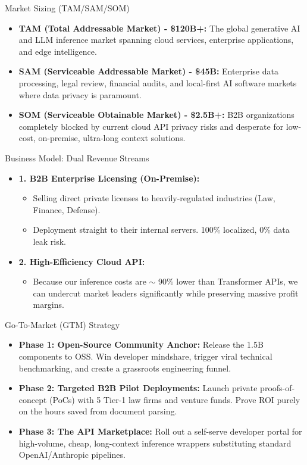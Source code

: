 ﻿\documentclass[aspectratio=169, 10pt]{beamer}
\begin{document}
\begin{frame}{Market Sizing (TAM/SAM/SOM)}
\begin{itemize}
    \item \textbf{TAM (Total Addressable Market) - \$120B+:} The global generative AI and LLM inference market spanning cloud services, enterprise applications, and edge intelligence.
    \item \textbf{SAM (Serviceable Addressable Market) - \$45B:} Enterprise data processing, legal review, financial audits, and local-first AI software markets where data privacy is paramount.
    \item \textbf{SOM (Serviceable Obtainable Market) - \$2.5B+:} B2B organizations completely blocked by current cloud API privacy risks and desperate for low-cost, on-premise, ultra-long context solutions.
\end{itemize}
\end{frame}

\begin{frame}{Business Model: Dual Revenue Streams}
\begin{itemize}
    \item \textbf{1. B2B Enterprise Licensing (On-Premise):}
    \begin{itemize}
        \item Selling direct private licenses to heavily-regulated industries (Law, Finance, Defense).
        \item Deployment straight to their internal servers. 100\% localized, 0\% data leak risk.
    \end{itemize}
    \item \textbf{2. High-Efficiency Cloud API:}
    \begin{itemize}
        \item Because our inference costs are $\sim$ 90\% lower than Transformer APIs, we can undercut market leaders significantly while preserving massive profit margins.
    \end{itemize}
\end{itemize}
\end{frame}

\begin{frame}{Go-To-Market (GTM) Strategy}
\begin{itemize}
    \item \textbf{Phase 1: Open-Source Community Anchor:} Release the 1.5B components to OSS. Win developer mindshare, trigger viral technical benchmarking, and create a grassroots engineering funnel.
    \item \textbf{Phase 2: Targeted B2B Pilot Deployments:} Launch private proofs-of-concept (PoCs) with 5 Tier-1 law firms and venture funds. Prove ROI purely on the hours saved from document parsing.
    \item \textbf{Phase 3: The API Marketplace:} Roll out a self-serve developer portal for high-volume, cheap, long-context inference wrappers substituting standard OpenAI/Anthropic pipelines.
\end{itemize}
\end{frame}
\end{document}
